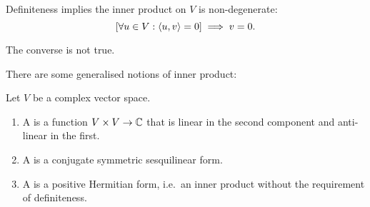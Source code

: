 \begin{lemma} \label{nonDegeneracyInnerProduct}
Definiteness implies the inner product on $V$ is non-degenerate:
\[ [\forall u\in V:\left\langle u,v \right\rangle = 0] \implies v = 0. \]
\end{lemma}
The converse is not true.

There are some generalised notions of inner product:
\begin{definition}
Let $V$ be a complex vector space.
\begin{enumerate}
\item A  is a function $V\times V\to \mathbb{C}$ that is linear in the second component and anti-linear in the first.
\item A  is a conjugate symmetric sesquilinear form.
\item A  is a positive Hermitian form, i.e.\ an inner product without the requirement of definiteness.
\end{enumerate}
\end{definition}

